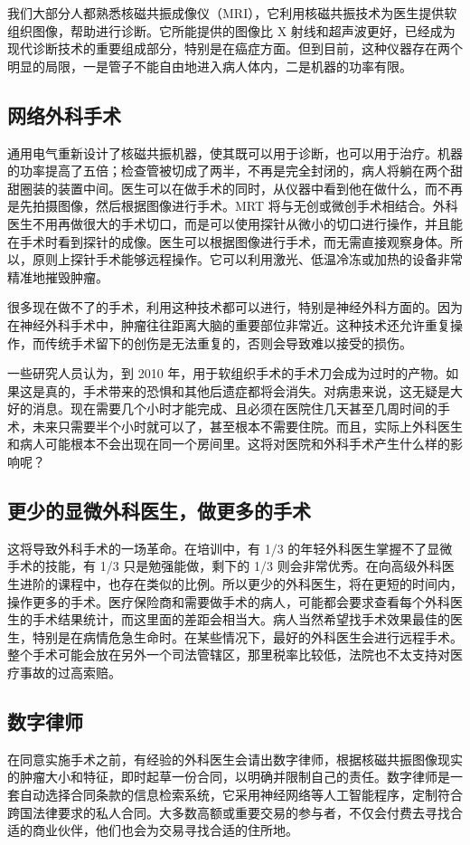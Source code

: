 我们大部分人都熟悉核磁共振成像仪（MRI），它利用核磁共振技术为医生提供软组织图像，帮助进行诊断。它所能提供的图像比 X 射线和超声波更好，已经成为现代诊断技术的重要组成部分，特别是在癌症方面。但到目前，这种仪器存在两个明显的局限，一是管子不能自由地进入病人体内，二是机器的功率有限。

\subsection{网络外科手术}
通用电气重新设计了核磁共振机器，使其既可以用于诊断，也可以用于治疗。机器的功率提高了五倍；检查管被切成了两半，不再是完全封闭的，病人将躺在两个甜甜圈装的装置中间。医生可以在做手术的同时，从仪器中看到他在做什么，而不再是先拍摄图像，然后根据图像进行手术。MRT 将与无创或微创手术相结合。外科医生不用再做很大的手术切口，而是可以使用探针从微小的切口进行操作，并且能在手术时看到探针的成像。医生可以根据图像进行手术，而无需直接观察身体。所以，原则上探针手术能够远程操作。它可以利用激光、低温冷冻或加热的设备非常精准地摧毁肿瘤。

很多现在做不了的手术，利用这种技术都可以进行，特别是神经外科方面的。因为在神经外科手术中，肿瘤往往距离大脑的重要部位非常近。这种技术还允许重复操作，而传统手术留下的创伤是无法重复的，否则会导致难以接受的损伤。

一些研究人员认为，到 2010 年，用于软组织手术的手术刀会成为过时的产物。如果这是真的，手术带来的恐惧和其他后遗症都将会消失。对病患来说，这无疑是大好的消息。现在需要几个小时才能完成、且必须在医院住几天甚至几周时间的手术，未来只需要半个小时就可以了，甚至根本不需要住院。而且，实际上外科医生和病人可能根本不会出现在同一个房间里。这将对医院和外科手术产生什么样的影响呢？

\subsection{更少的显微外科医生，做更多的手术}
这将导致外科手术的一场革命。在培训中，有 1/3 的年轻外科医生掌握不了显微手术的技能，有 1/3 只是勉强能做，剩下的 1/3 则会非常优秀。在向高级外科医生进阶的课程中，也存在类似的比例。所以更少的外科医生，将在更短的时间内，操作更多的手术。医疗保险商和需要做手术的病人，可能都会要求查看每个外科医生的手术结果统计，而这里面的差距会相当大。病人当然希望找手术效果最佳的医生，特别是在病情危急生命时。在某些情况下，最好的外科医生会进行远程手术。整个手术可能会放在另外一个司法管辖区，那里税率比较低，法院也不太支持对医疗事故的过高索赔。

\subsection{数字律师}
在同意实施手术之前，有经验的外科医生会请出数字律师，根据核磁共振图像现实的肿瘤大小和特征，即时起草一份合同，以明确并限制自己的责任。数字律师是一套自动选择合同条款的信息检索系统，它采用神经网络等人工智能程序，定制符合跨国法律要求的私人合同。大多数高额或重要交易的参与者，不仅会付费去寻找合适的商业伙伴，他们也会为交易寻找合适的住所地。

